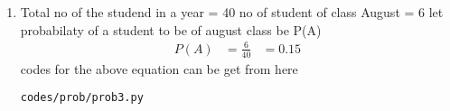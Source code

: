 \renewcommand{\theequation}{\theenumi}
\begin{enumerate}[label=\arabic*.,ref=\thesubsection.\theenumi]
\item Total no of the studend in a year = 40
no of student of class August  = 6
let probabilaty of a student to be of august class  be P(A)
\begin{align}
P(A) &= \frac{6}{40}
&=0.15
\end{align}
codes for the above equation can be get from here
\begin{lstlisting}
codes/prob/prob3.py
\end{lstlisting}
\end{enumerate}
